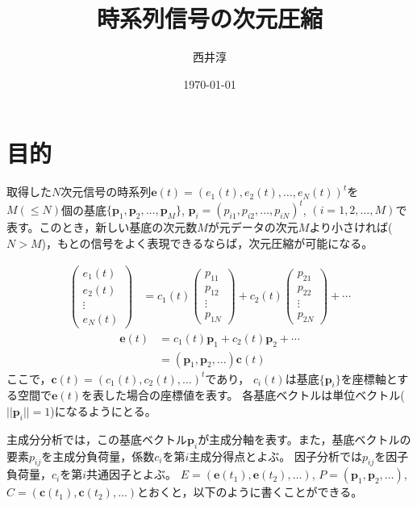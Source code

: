 \documentclass[a4paper,11pt]{jsarticle}
\begin{document}
\title{時系列信号の次元圧縮}
\author{西井淳}
\date{\today}
\maketitle

\section{目的}
取得した$N$次元信号の時系列$\bm{e}(t)=(e_1(t),e_2(t),\ldots,e_N(t))^t$を$M(\le N)$個の基底$\{\bm{p}_1,\bm{p}_2,\ldots,\bm{p}_M\}$, $\bm{p}_i=(p_{i1},p_{i2},\ldots, p_{iN})^t$, $(i=1,2,\ldots,M)$で表す。このとき，新しい基底の次元数$M$が元データの次元$M$より小さければ($N>M$)，もとの信号をよく表現できるならば，次元圧縮が可能になる。

\begin{align}
\begin{pmatrix}
  e_1(t) \\
  e_2(t) \\
  \vdots\\
  e_N(t)
\end{pmatrix}
&=
c_1(t)
\begin{pmatrix}
p_{11}\\
p_{12}\\
\vdots\\
p_{1N}
\end{pmatrix}
+
c_2(t)
\begin{pmatrix}
p_{21}\\
p_{22}\\
\vdots\\
p_{2N}
\end{pmatrix}
+ \cdots
\end{align}
\begin{align}
  \bm{e}(t)&=c_1(t)\bm{p}_1+c_2(t)\bm{p}_2+\cdots\\
  &=(\bm{p}_1,\bm{p}_2,\ldots)\bm{c}(t)
\end{align}
ここで，$\bm{c}(t)=(c_1(t),c_2(t),\ldots)^t$であり，
$c_i(t)$は基底$\{\bm{p}_i\}$を座標軸とする空間で$\bm{e}(t)$を表した場合の座標値を表す。
各基底ベクトルは単位ベクトル($||\bm{p}_i||=1$)になるようにとる。

主成分分析では，この基底ベクトル$\bm{p}_i$が主成分軸を表す。また，基底ベクトルの要素$p_{ij}$を主成分負荷量，係数$c_i$を第$i$主成分得点とよぶ。
因子分析では$p_{ij}$を因子負荷量，$c_i$を第$i$共通因子とよぶ。
$E=(\bm{e}(t_1),\bm{e}(t_2),\ldots)$, $P=(\bm{p}_1,\bm{p}_2,\ldots)$, $C=(\bm{c}(t_1),\bm{c}(t_2),\ldots)$とおくと，以下のように書くことができる。
\end{document}
